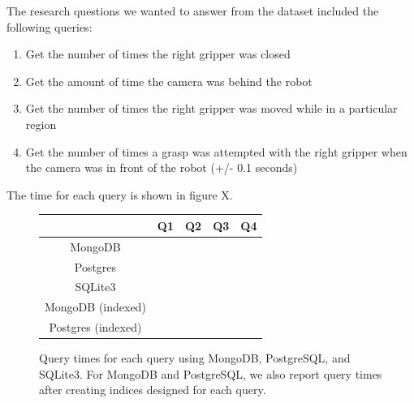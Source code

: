 \documentclass[nocopyrightspace]{acm_proc_article-sp}
\begin{document}

The research questions we wanted to answer from the dataset included the following queries:
\begin{enumerate}[label=Q\arabic*]
\item Get the number of times the right gripper was closed
\item Get the amount of time the camera was behind the robot
\item Get the number of times the right gripper was moved while in a particular region
\item Get the number of times a grasp was attempted with the right gripper when the camera was in front of the robot (+/- 0.1 seconds)
\end{enumerate}

The time for each query is shown in figure X.

\begin{figure}
\centering
\begin{tabular}{c | c | c | c | c}
  & Q1 & Q2 & Q3 & Q4 \\
 \hline
 MongoDB & & & & \\
 Postgres & & & & \\
 SQLite3 & & & & \\
 MongoDB (indexed) & & & & \\
 Postgres (indexed) & & & & 
\end{tabular}
\caption{Query times for each query using MongoDB, PostgreSQL, and SQLite3. For MongoDB and PostgreSQL, we also report query times after creating indices designed for each query.}
\label{fig:my_label}
\end{figure}
\end{document}
